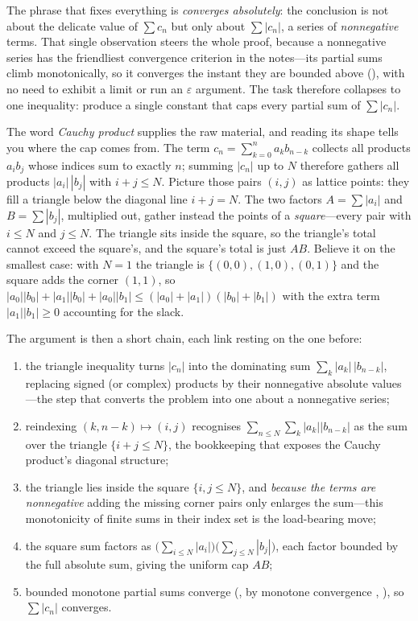 \documentclass[main.tex]{subfiles}
\begin{document}
\begin{Reflection}
The phrase that fixes everything is \emph{converges absolutely}: the conclusion is not about the
delicate value of $\sum c_{n}$ but only about $\sum|c_{n}|$, a series of \emph{nonnegative} terms. That
single observation steers the whole proof, because a nonnegative series has the friendliest convergence
criterion in the notes---its partial sums climb monotonically, so it converges the instant they are
bounded above (), with no need to exhibit a limit or run an $\varepsilon$ argument. The
task therefore collapses to one inequality: produce a single constant that caps every partial sum of
$\sum|c_{n}|$.

The word \emph{Cauchy product} supplies the raw material, and reading its shape tells you where the cap
comes from. The term $c_{n}=\sum_{k=0}^{n}a_{k}b_{n-k}$ collects all products $a_{i}b_{j}$ whose indices
sum to exactly $n$; summing $|c_{n}|$ up to $N$ therefore gathers all products $|a_{i}|\,|b_{j}|$ with
$i+j\le N$. Picture those pairs $(i,j)$ as lattice points: they fill a triangle below the diagonal line
$i+j=N$. The two factors $A=\sum|a_{i}|$ and $B=\sum|b_{j}|$, multiplied out, gather instead the points
of a \emph{square}---every pair with $i\le N$ and $j\le N$. The triangle sits inside the square, so the
triangle's total cannot exceed the square's, and the square's total is just $AB$. Believe it on the
smallest case: with $N=1$ the triangle is $\{(0,0),(1,0),(0,1)\}$ and the square adds the corner
$(1,1)$, so $|a_0||b_0|+|a_1||b_0|+|a_0||b_1|\le(|a_0|+|a_1|)(|b_0|+|b_1|)$ with the extra term
$|a_1||b_1|\ge 0$ accounting for the slack.

The argument is then a short chain, each link resting on the one before:
\begin{enumerate}[leftmargin=1.7em,itemsep=3pt,topsep=2pt,label=\textnormal{(\arabic*)}]
  \item the triangle inequality turns $|c_{n}|$ into the dominating sum $\sum_{k}|a_{k}|\,|b_{n-k}|$,
        replacing signed (or complex) products by their nonnegative absolute values---the step that
        converts the problem into one about a nonnegative series;
  \item reindexing $(k,n-k)\mapsto(i,j)$ recognises $\sum_{n\le N}\sum_{k}|a_{k}||b_{n-k}|$ as the sum
        over the triangle $\{i+j\le N\}$, the bookkeeping that exposes the Cauchy product's diagonal
        structure;
  \item the triangle lies inside the square $\{i,j\le N\}$, and \emph{because the terms are
        nonnegative} adding the missing corner pairs only enlarges the sum---this monotonicity of finite
        sums in their index set is the load-bearing move;
  \item the square sum factors as $\bigl(\sum_{i\le N}|a_{i}|\bigr)\bigl(\sum_{j\le N}|b_{j}|\bigr)$,
        each factor bounded by the full absolute sum, giving the uniform cap $AB$;
  \item bounded monotone partial sums converge (, by monotone convergence
        , ), so $\sum|c_{n}|$
        converges.
\end{enumerate}


\end{Reflection}
\end{document}
